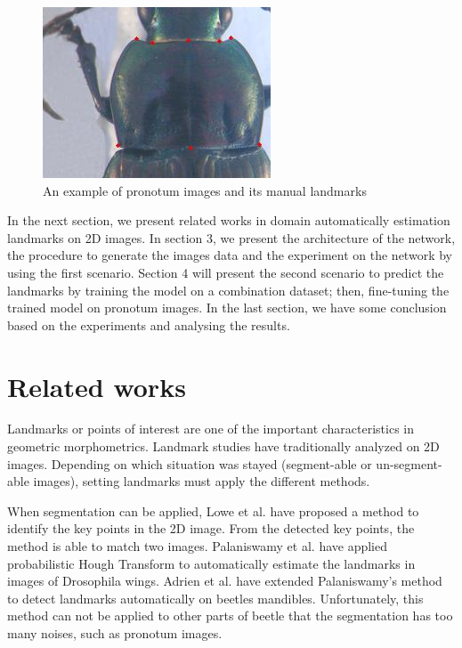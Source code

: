 \documentclass[10pt]{article}
\begin{document}
\begin{figure}[htbp]
\centering
	\centerline{\includegraphics[scale=0.75]{images/pronotum}}
	\caption{An example of pronotum images and its manual landmarks}
	\label{figpronotum}
\end{figure}

In the next section, we present related works in domain automatically estimation landmarks on 2D images. In section 3, we present the architecture of the network, the procedure to generate the images data and the experiment on the network by using the first scenario. Section 4 will present the second scenario to predict the landmarks by training the model on a combination dataset; then, fine-tuning the trained model on pronotum images. In the last section, we have some conclusion based on the experiments and analysing the results.

\section{Related works}
Landmarks or points of interest are one of the important characteristics in geometric morphometrics. Landmark studies have traditionally analyzed on 2D images. Depending on which situation was stayed (segment-able or un-segment-able images), setting landmarks must apply the different methods.

When segmentation can be applied, Lowe et al. \cite{lowe2004distinctive} have proposed a method to identify the key points in the 2D image. From the detected key points, the method is able to match two images. Palaniswamy et al. \cite{palaniswamy2010automatic} have applied probabilistic Hough Transform to automatically estimate the landmarks in images of Drosophila wings. Adrien et al. \cite{le2017maelab} have extended Palaniswamy's method to detect landmarks automatically on beetles mandibles. Unfortunately, this method can not be applied to other parts of beetle that the segmentation has too many noises, such as pronotum images.
\end{document}
